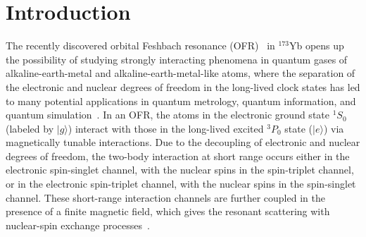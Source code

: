 \documentclass[a4paper, aps,pra, twocolumn, superscriptaddress, showpacs]{revtex4}
\begin{document}
\maketitle


\section{Introduction}
The recently discovered orbital Feshbach resonance (OFR)~\cite{zhang_orbital_2015,pagano_strongly_2015,hofer_observation_2015} in $^{173}$Yb opens up the possibility of studying strongly interacting phenomena in quantum gases of alkaline-earth-metal and alkaline-earth-metal-like atoms, where the separation of the electronic and nuclear degrees of freedom in the long-lived clock states has led to many potential applications in quantum metrology, quantum information, and quantum simulation~\cite{wu_exact_2003,takamoto_optical_2005,ludlow_systematic_2006,fukuhara_degenerate_2007,gorshkov_alkaline-earth-metal_2009,zhang_spectroscopic_2014,cappellini_direct_2014,scazza_observation_2014,bloom_optical_2014,ludlow_optical_2015}. In an OFR, the atoms in the electronic ground state $^1S_0$ (labeled by $|g\rangle$) interact with those in the long-lived excited $^3P_0$ state ($|e\rangle$) via magnetically tunable interactions. Due to the decoupling of electronic and nuclear degrees of freedom, the two-body interaction at short range occurs either in the electronic spin-singlet channel, with the nuclear spins in the spin-triplet channel, or in the electronic spin-triplet channel, with the nuclear spins in the spin-singlet channel. These short-range interaction channels are further coupled in the presence of a finite magnetic field, which gives the resonant scattering with nuclear-spin exchange processes~\cite{zhang_orbital_2015,pagano_strongly_2015,hofer_observation_2015}.
\end{document}
